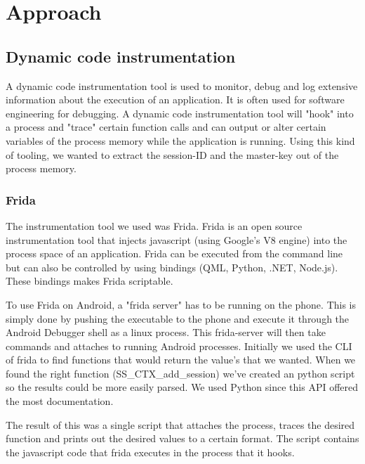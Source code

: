 \documentclass[12pt, a4paper]{report}
\begin{document}
\chapter{Approach}
\section{Dynamic code instrumentation}

A dynamic code instrumentation tool is used to monitor, debug and log extensive information about the execution of an application. It is often used for software engineering for debugging. A dynamic code instrumentation tool will "hook" into a process and "trace" certain function calls and can output or alter certain variables of the process memory while the application is running.
\newline
\newline
Using this kind of tooling, we wanted to extract the session-ID and the master-key out of the process memory. 

\subsection{Frida}

The instrumentation tool we used was Frida. Frida is an open source instrumentation tool that injects javascript (using Google's V8 engine) into the process space of an application. Frida can be executed from the command line but can also be controlled by using bindings (QML, Python, .NET, Node.js). These bindings makes Frida scriptable. 

To use Frida on Android, a "frida server" has to be running on the phone. This is simply done by pushing the executable to the phone and execute it through the Android Debugger shell as a linux process. This frida-server will then take commands and attaches to running Android processes.
\newline
\newline
Initially we used the CLI of frida to find functions that would return the value's that we wanted. When we found the right function (SS\_CTX\_add\_session) we've created an python script so the results could be more easily parsed. We used Python since this API offered the most documentation. 

The result of this was a single script that attaches the process, traces the desired function and prints out the desired values to a certain format. The script contains the javascript code that frida executes in the process that it hooks.
\end{document}

